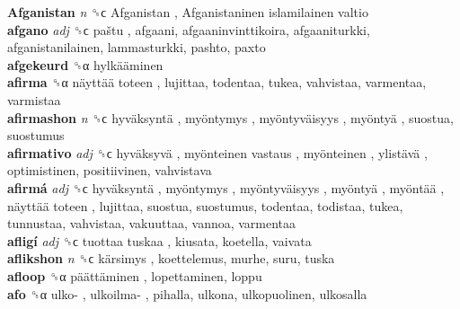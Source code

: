 \textbf{Afganistan} \emph{n}  ␝ϲ   Afganistan ,  Afganistaninen islamilainen valtio   \\
\textbf{afgano} \emph{adj}  ␝ϲ   paštu , afgaani, afgaaninvinttikoira, afgaaniturkki, afganistanilainen, lammasturkki, pashto, paxto  \\
\textbf{afgekeurd} ␝α   hylkääminen   \\
\textbf{afirma} ␝α   näyttää toteen , lujittaa, todentaa, tukea, vahvistaa, varmentaa, varmistaa  \\
\textbf{afirmashon} \emph{n}  ␝ϲ   hyväksyntä ,  myöntymys ,  myöntyväisyys ,  myöntyä , suostua, suostumus  \\
\textbf{afirmativo} \emph{adj}  ␝ϲ   hyväksyvä ,  myönteinen vastaus ,  myönteinen ,  ylistävä , optimistinen, positiivinen, vahvistava  \\
\textbf{afirmá} \emph{adj}  ␝ϲ   hyväksyntä ,  myöntymys ,  myöntyväisyys ,  myöntyä ,  myöntää ,  näyttää toteen , lujittaa, suostua, suostumus, todentaa, todistaa, tukea, tunnustaa, vahvistaa, vakuuttaa, vannoa, varmentaa  \\
\textbf{afligí} \emph{adj}  ␝ϲ   tuottaa tuskaa , kiusata, koetella, vaivata  \\
\textbf{aflikshon} \emph{n}  ␝ϲ   kärsimys , koettelemus, murhe, suru, tuska  \\
\textbf{afloop} ␝α   päättäminen , lopettaminen, loppu  \\
\textbf{afo} ␝α   ulko- ,  ulkoilma- , pihalla, ulkona, ulkopuolinen, ulkosalla  \\
